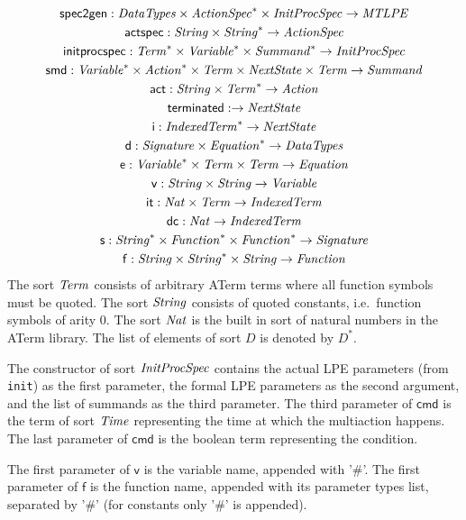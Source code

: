 \documentclass[twoside,fleqn,a4paper,dvips]{article}
\newcommand{\afunc}[3]{\mathsf{#1}:#2\rightarrow#3}
\begin{document}
\begin{gather*}
\afunc{spec2gen}{\nm{DataTypes}\x\nm{ActionSpec}^*\x\nm{InitProcSpec}}{\nm{MTLPE}}\\
\afunc{actspec}{\nm{String}\x\nm{String}^*}{\nm{ActionSpec}}\\
\afunc{initprocspec}{\nm{Term}^*\x\nm{Variable}^*\x\nm{Summand}^*}{\nm{InitProcSpec}}\\
\afunc{smd}{\nm{Variable}^*\x\nm{Action}^*\x\nm{Term}\x\nm{NextState}\x\nm{Term}}{\nm{Summand}}\\
\afunc{act}{\nm{String}\x\nm{Term}^*}{\nm{Action}}\\
\afunc{terminated}{}{\nm{NextState}}\\
\afunc{i}{\nm{IndexedTerm}^*}{\nm{NextState}}\\
\afunc{d}{\nm{Signature}\x\nm{Equation}^*}{\nm{DataTypes}}\\
\afunc{e}{\nm{Variable}^*\x\nm{Term}\x\nm{Term}}{\nm{Equation}}\\
\afunc{v}{\nm{String}\x\nm{String}}{\nm{Variable}}\\
\afunc{it}{\Nat\x\nm{Term}}{\nm{IndexedTerm}}\\
\afunc{dc}{\Nat}{\nm{IndexedTerm}}\\
\afunc{s}{\nm{String}^*\x\nm{Function}^*\x\nm{Function}^*}{\nm{Signature}}\\
\afunc{f}{\nm{String}\x\nm{String}^{*}\x\nm{String}}{\nm{Function}}
\end{gather*}
The sort $\mathit{Term}$ consists of arbitrary ATerm terms where all function
symbols must be quoted. The sort $\mathit{String}$ consists of quoted constants,
i.e.\ function symbols of arity 0. The sort $\mathit{Nat}$ is the built in
sort of natural numbers in the ATerm library. The list
of elements of sort $D$ is denoted by $D^{*}$.

The constructor of sort $\mathit{InitProcSpec}$ contains the actual LPE
parameters (from \texttt{init}) as the first parameter, the formal LPE
parameters as the second argument, and the list of summands as the
third parameter. The third parameter of $\mathsf{cmd}$ is the term of
sort $\mathit{Time}$ representing the time at which the multiaction
happens.  The last parameter of $\mathsf{cmd}$ is the boolean term
representing the condition.

The first parameter of $\mathsf{v}$ is the variable name, appended with '\#'.
The first parameter of $\mathsf{f}$ is the function name, appended 
with its parameter types list, separated by '\#' (for constants only '\#' is appended).
\end{document}
